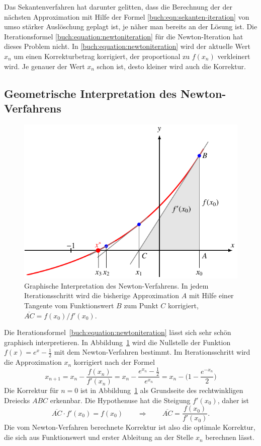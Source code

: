 Das Sekantenverfahren hat darunter gelitten, dass die Berechnung
der der nächsten Approximation mit Hilfe der Formel 
\eqref{buch:eqn:sekanten-iteration} von umso stärker Auslöschung
geplagt ist, je näher man bereits an der Lösung ist.
%
Die Iterationsformel
\eqref{buch:equation:newtoniteration}
für die Newton-Iteration hat dieses Problem nicht.
In \eqref{buch:equation:newtoniteration} wird der aktuelle Wert $x_n$
um einen Korrekturbetrag korrigiert, der proportional zu $f(x_n)$
verkleinert wird.
Je genauer der Wert $x_n$ schon ist, desto kleiner wird auch die
Korrektur.

%
%
\subsection{Geometrische Interpretation des Newton-Verfahrens}
\begin{figure}
\centering
\includegraphics{chapters/20-gleichungen/figures/newton.pdf}
\caption{Graphische Interpretation des Newton-Verfahrens.
In jedem Iterationsschritt wird die bisherige Approximation $A$
mit Hilfe einer Tangente vom Funktionswert $B$ zum Punkt $C$
korrigiert, $\overline{AC}=f(x_0)/f'(x_0)$.
\label{buch:figure:newton}}
\end{figure}
Die Iterationsformel~\eqref{buch:equation:newtoniteration}
lässt sich sehr schön graphisch interpretieren.
In Abbildung~\ref{buch:figure:newton} wird die Nullstelle der
Funktion $f(x) = e^x-\frac12$ mit dem Newton-Verfahren bestimmt.
Im Iterationsschritt wird die Approximation $x_n$ korrigiert
nach der Formel
\[
x_{n+1}
=
x_n - \frac{f(x_n)}{f'(x_n)}
=
x_n - \frac{e^{x_n}-\frac12}{e^{x_n}}
=
x_n - \biggl(1 -\frac{e^{-x_n}}{2}\biggr)
\]
Die Korrektur für $n=0$ ist in Abbildung~\ref{buch:figure:newton}
als Grundseite des rechtwinkligen Dreiecks $ABC$ erkennbar.
Die Hypothenuse hat die Steigung $f'(x_0)$, daher ist
%
%
\[
\overline{AC}\cdot f'(x_0) = f(x_0)
\qquad\Rightarrow\qquad
\overline{AC} = \frac{f(x_0)}{f'(x_0)}.
\]
Die vom Newton-Verfahren berechnete Korrektur ist also die optimale
Korrektur, die sich aus Funktionswert und erster Ableitung
an der Stelle $x_n$ berechnen lässt.
%

